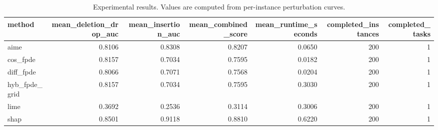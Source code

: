\begin{table}[t]
\caption{Experimental results. Values are computed from per-instance perturbation curves.}
\label{tab:main_results_computed}
\centering
\begin{tabular}{lrrrrrr}
\toprule
method & mean\_deletion\_drop\_auc & mean\_insertion\_auc & mean\_combined\_score & mean\_runtime\_seconds & completed\_instances & completed\_tasks \\
\midrule
aime & 0.8106 & 0.8308 & 0.8207 & 0.0650 & 200 & 1 \\
cos\_fpde & 0.8157 & 0.7034 & 0.7595 & 0.0182 & 200 & 1 \\
diff\_fpde & 0.8066 & 0.7071 & 0.7568 & 0.0204 & 200 & 1 \\
hyb\_fpde\_grid & 0.8157 & 0.7034 & 0.7595 & 0.3030 & 200 & 1 \\
lime & 0.3692 & 0.2536 & 0.3114 & 0.3006 & 200 & 1 \\
shap & 0.8501 & 0.9118 & 0.8810 & 0.6220 & 200 & 1 \\
\bottomrule
\end{tabular}

\end{table}
